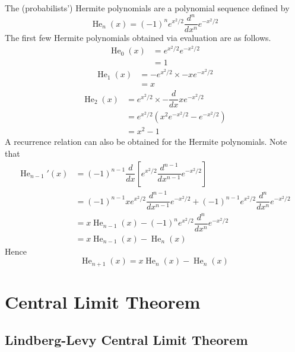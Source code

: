 \documentclass[11pt]{report} %
\begin{document}
The (probabilists') Hermite polynomials are a polynomial sequence defined by
\begin{equation}
\operatorname{He}_{n}\left(x\right) = \left(-1\right)^{n}e^{x^{2}/2}\dfrac{d^{n}}{dx^{n}}e^{-x^{2}/2}
\end{equation}
The first few Hermite polynomials obtained via evaluation are as follows.
\begin{align}
\operatorname{He}_{0}\left(x\right) &= e^{x^{2}/2}e^{-x^{2}/2} \\
&= 1
\end{align}
\begin{align}
\operatorname{He}_{1}\left(x\right) &= -e^{x^{2}/2}\times -xe^{-x^{2}/2} \\
&= x
\end{align}
\begin{align}
\operatorname{He}_{2}\left(x\right) &= e^{x^{2}/2}\times -\dfrac{d}{dx}xe^{-x^{2}/2} \\
&= e^{x^{2}/2}\left(x^{2}e^{-x^{2}/2} - e^{-x^{2}/2}\right) \\
&= x^{2} - 1
\end{align}
A recurrence relation can also be obtained for the Hermite polynomials. Note that
\begin{align}
\operatorname{He}_{n - 1}'\left(x\right) &= \left(-1\right)^{n-1}\dfrac{d}{dx}\left[e^{x^{2}/2}\dfrac{d^{n-1}}{dx^{n-1}}e^{-x^{2}/2}\right] \\
&= \left(-1\right)^{n-1}xe^{x^{2}/2}\dfrac{d^{n-1}}{dx^{n-1}}e^{-x^{2}/2} + \left(-1\right)^{n-1}e^{x^{2}/2}\dfrac{d^{n}}{dx^{n}}e^{-x^{2}/2} \\
&= x\operatorname{He}_{n-1}\left(x\right) - \left(-1\right)^{n}e^{x^{2}/2}\dfrac{d^{n}}{dx^{n}}e^{-x^{2}/2} \\
&= x\operatorname{He}_{n-1}\left(x\right) - \operatorname{He}_{n}\left(x\right)
\end{align}
Hence
\begin{equation}
\operatorname{He}_{n + 1}\left(x\right) = x\operatorname{He}_{n}\left(x\right)
- \operatorname{He}_{n}\left(x\right)
\end{equation}

\section{Central Limit Theorem}

\subsection{Lindberg-Levy Central Limit Theorem \cite{Kallenberg1997}}
\end{document}
